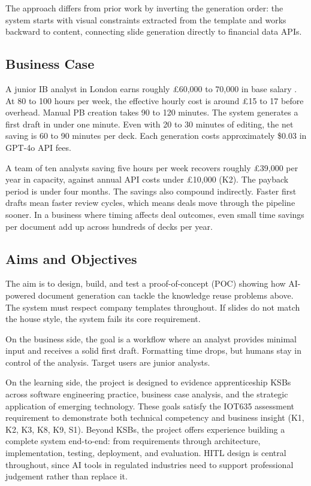 The approach differs from prior work by inverting the generation order: the system starts with visual constraints extracted from the template and works backward to content, connecting slide generation directly to financial data APIs.

\subsection{Business Case}

A junior IB analyst in London earns roughly \pounds 60,000 to 70,000 in base salary \parencite{glassdoor2025}. At 80 to 100 hours per week, the effective hourly cost is around \pounds 15 to 17 before overhead. Manual PB creation takes 90 to 120 minutes. The system generates a first draft in under one minute. Even with 20 to 30 minutes of editing, the net saving is 60 to 90 minutes per deck. Each generation costs approximately \$0.03 in GPT-4o API fees.

A team of ten analysts saving five hours per week recovers roughly \pounds 39,000 per year in capacity, against annual API costs under \pounds 10,000 (K2). The payback period is under four months. The savings also compound indirectly. Faster first drafts mean faster review cycles, which means deals move through the pipeline sooner. In a business where timing affects deal outcomes, even small time savings per document add up across hundreds of decks per year.

\subsection{Aims and Objectives}

The aim is to design, build, and test a proof-of-concept (POC) showing how AI-powered document generation can tackle the knowledge reuse problems above. The system must respect company templates throughout. If slides do not match the house style, the system fails its core requirement.

On the business side, the goal is a workflow where an analyst provides minimal input and receives a solid first draft. Formatting time drops, but humans stay in control of the analysis. Target users are junior analysts.

On the learning side, the project is designed to evidence apprenticeship KSBs across software engineering practice, business case analysis, and the strategic application of emerging technology. These goals satisfy the IOT635 assessment requirement to demonstrate both technical competency and business insight (K1, K2, K3, K8, K9, S1). Beyond KSBs, the project offers experience building a complete system end-to-end: from requirements through architecture, implementation, testing, deployment, and evaluation. HITL design is central throughout, since AI tools in regulated industries need to support professional judgement rather than replace it.

